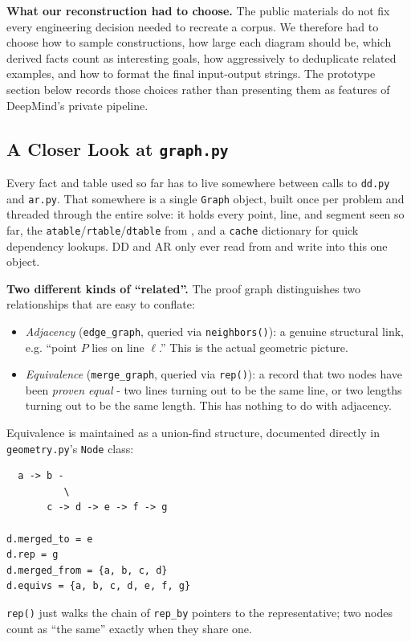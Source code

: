 \documentclass[reqno]{amsart}
\DeclareMathOperator{\1}{\textbf{1}}
\begin{document}
\textbf{What our reconstruction had to choose.} The public materials do not
fix every engineering decision needed to recreate a corpus. We therefore had
to choose how to sample constructions, how large each diagram should be,
which derived facts count as interesting goals, how aggressively to
deduplicate related examples, and how to format the final input-output
strings. The prototype section below records those choices rather than
presenting them as features of DeepMind's private pipeline.

\subsection{A Closer Look at \texttt{graph.py}}\label{sec: graph.py}

Every fact and table used so far has to live somewhere between calls to
\texttt{dd.py} and \texttt{ar.py}. That somewhere is a single \texttt{Graph}
object, built once per problem and threaded through the entire solve: it
holds every point, line, and segment seen so far, the
\texttt{atable}/\texttt{rtable}/\texttt{dtable} from , and a
\texttt{cache} dictionary for quick dependency lookups. DD and AR only ever
read from and write into this one object.

\textbf{Two different kinds of ``related''.} The proof graph distinguishes
two relationships that are easy to conflate:
\begin{itemize}
    \item \emph{Adjacency} (\texttt{edge\_graph}, queried via
          \texttt{neighbors()}): a genuine structural link, e.g. ``point $P$
          lies on line $\ell$.'' This is the actual geometric picture.
    \item \emph{Equivalence} (\texttt{merge\_graph}, queried via
          \texttt{rep()}): a record that two nodes have been \emph{proven
          equal} - two lines turning out to be the same line, or two lengths
          turning out to be the same length. This has nothing to do with
          adjacency.
\end{itemize}
Equivalence is maintained as a union-find structure, documented directly in
\texttt{geometry.py}'s \texttt{Node} class:
\begin{lstlisting}
  a -> b -
          \
       c -> d -> e -> f -> g

d.merged_to = e
d.rep = g
d.merged_from = {a, b, c, d}
d.equivs = {a, b, c, d, e, f, g}
\end{lstlisting}
\texttt{rep()} just walks the chain of \texttt{rep\_by} pointers to the
representative; two nodes count as ``the same'' exactly when they share one.
\end{document}
